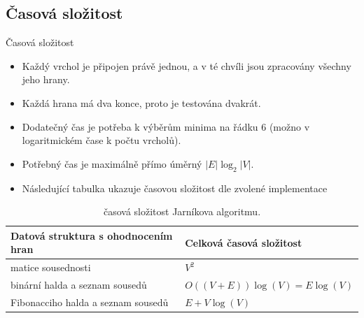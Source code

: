 \documentclass[pdf]{beamer}
\begin{document}
\subsection{Časová složitost}
\begin{frame}{Časová složitost}

\begin{itemize}
\item<1-> Každý vrchol je připojen právě jednou, a v té chvíli jsou zpracovány všechny jeho hrany.
\item<2->  Každá hrana má dva konce, proto je testována dvakrát.
\item<3->  Dodatečný čas je potřeba k výběrům minima na řádku 6 (možno v logaritmickém čase k počtu vrcholů).
\item<4->  Potřebný čas je maximálně přímo úměrný $ |E| \log_2|V| $.
\item<5->  Následující tabulka ukazuje časovou složitost dle zvolené implementace
\end{itemize}


\small
{}
\begin{table}
\centering
\begin{tabular}{| l | l |}
\hline
\textbf{Datová struktura s ohodnocením hran} & \textbf{Celková časová složitost}\\\hline
matice sousednosti & $V^2$ \\
binární halda a seznam sousedů & $O((V+E))\log(V)=E \log (V)$ \\
Fibonacciho halda a seznam sousedů & $E+V\log(V)$ \\
\hline
\end{tabular}
\caption{\label{tab:widgets}časová složitost Jarníkova algoritmu.}
\end{table}

\end{frame}

\normalsize
\end{document}
